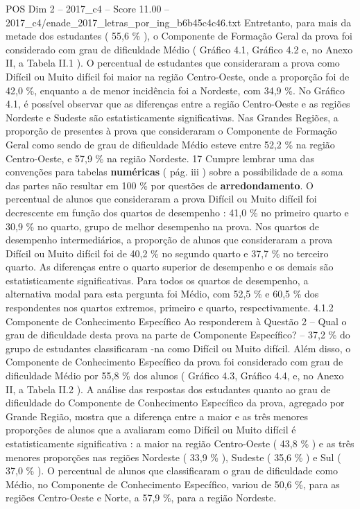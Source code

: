 \begin{textsample}{POS Dim 2 – 2017\_c4 – Score 11.00 – 2017\_c4/enade\_2017\_letras\_por\_ing\_b6b45c4c46.txt}
Entretanto, para mais da metade dos estudantes ( 55,6 \% ), o Componente de Formação Geral da prova foi considerado com grau de dificuldade Médio ( Gráfico 4.1, Gráfico 4.2 e, no Anexo II, a Tabela II.1 ).
O percentual de estudantes que consideraram a prova como Difícil ou Muito difícil foi maior na região Centro-Oeste, onde a proporção foi de 42,0 \%, enquanto a de menor incidência foi a Nordeste, com 34,9 \%.
No Gráfico 4.1, é possível observar que as diferenças entre a região Centro-Oeste e as regiões Nordeste e Sudeste são estatisticamente significativas.
Nas Grandes Regiões, a proporção de presentes à prova que consideraram o Componente de Formação Geral como sendo de grau de dificuldade Médio esteve entre 52,2 \% na região Centro-Oeste, e 57,9 \% na região Nordeste. 17 Cumpre lembrar uma das convenções para tabelas \textbf{numéricas} ( pág. iii ) sobre a possibilidade de a soma das partes não resultar em 100 \% por questões de \textbf{arredondamento}.
O percentual de alunos que consideraram a prova Difícil ou Muito difícil foi decrescente em função dos quartos de desempenho : 41,0 \% no primeiro quarto e 30,9 \% no quarto, grupo de melhor desempenho na prova.
Nos quartos de desempenho intermediários, a proporção de alunos que consideraram a prova Difícil ou Muito difícil foi de 40,2 \% no segundo quarto e 37,7 \% no terceiro quarto.
As diferenças entre o quarto superior de desempenho e os demais são estatisticamente significativas.
Para todos os quartos de desempenho, a alternativa modal para esta pergunta foi Médio, com 52,5 \% e 60,5 \% dos respondentes nos quartos extremos, primeiro e quarto, respectivamente. 4.1.2 Componente de Conhecimento Específico Ao responderem à Questão 2 – Qual o grau de dificuldade desta prova na parte de Componente Específico? – 37,2 \% do grupo de estudantes classificaram -na como Difícil ou Muito difícil.
Além disso, o Componente de Conhecimento Específico da prova foi considerado com grau de dificuldade Médio por 55,8 \% dos alunos ( Gráfico 4.3, Gráfico 4.4, e, no Anexo II, a Tabela II.2 ).
A análise das respostas dos estudantes quanto ao grau de dificuldade do Componente de Conhecimento Específico da prova, agregado por Grande Região, mostra que a diferença entre a maior e as três menores proporções de alunos que a avaliaram como Difícil ou Muito difícil é estatisticamente significativa : a maior na região Centro-Oeste ( 43,8 \% ) e as três menores proporções nas regiões Nordeste ( 33,9 \% ), Sudeste ( 35,6 \% ) e Sul ( 37,0 \% ).
O percentual de alunos que classificaram o grau de dificuldade como Médio, no Componente de Conhecimento Específico, variou de 50,6 \%, para as regiões Centro-Oeste e Norte, a 57,9 \%, para a região Nordeste.

\end{textsample}
